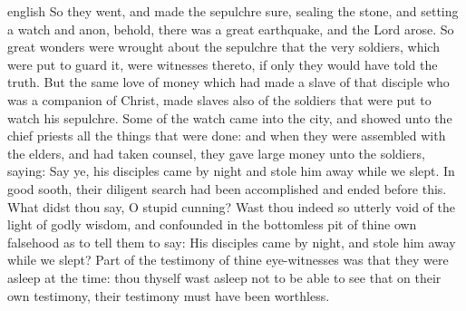 {english}
{\noindent So they went, and made the sepulchre sure, sealing the stone, and setting a watch and anon, behold, there was a great earthquake, and the Lord arose. So great wonders were wrought about the sepulchre that the very soldiers, which were put to guard it, were witnesses thereto, if only they would have told the truth. But the same love of money which had made a slave of that disciple who was a companion of Christ, made slaves also of the soldiers that were put to watch his sepulchre. Some of the watch came into the city, and showed unto the chief priests all the things that were done: and when they were assembled with the elders, and had taken counsel, they gave large money unto the soldiers, saying: Say ye, his disciples came by night and stole him away while we slept. In good sooth, their diligent search had been accomplished and ended before this. What didst thou say, O stupid cunning? Wast thou indeed so utterly void of the light of godly wisdom, and confounded in the bottomless pit of thine own falsehood as to tell them to say: His disciples came by night, and stole him away while we slept? Part of the testimony of thine eye-witnesses was that they were asleep at the time: thou thyself wast asleep not to be able to see that on their own testimony, their testimony must have been worthless.}